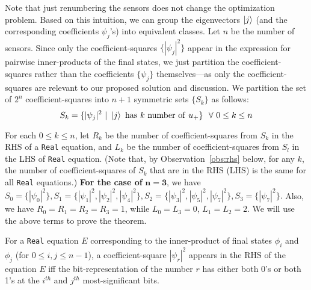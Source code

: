 Note that just renumbering the sensors does not change the optimization problem. 
Based on this intuition, we can group the eigenvectors $\ket{j}$
(and the corresponding coefficients $\psi_j$'s) into equivalent classes. 
Let $n$ be the number of sensors.  
Since only the coefficient-squares $\{|\psi_j|^2\}$ appear in the expression for pairwise inner-products of the final states, 
we just partition the coefficient-squares rather than the coefficients $\{\psi_j\}$ themselves---as only the coefficient-squares are relevant to our proposed solution and discussion. 
We partition the set of $2^n$ coefficient-squares into $n+1$ symmetric sets $\{S_k\}$ as follows: 
$$S_k =   \{|\psi_j|^{2}\ |\ \ket{j}\ {\rm has}\ k\  {\rm number\ of}\ u_{+}\}\ \ \forall \ 0 \leq k \leq n$$

\noindent
For each $0 \leq k \leq n$, let $R_k$ be the number of coefficient-squares from $S_k$ in the RHS of a {\tt Real} equation, and $L_k$ be the number of coefficient-squares from $S_l$ in the LHS of  {\tt Real} equation. (Note that, by Observation~\ref{obs:rhs} below, for any $k$, the number of coefficient-squares of $S_k$ that are in the RHS (LHS) is the same for all {\tt Real} equations.)
{\bf For the case of} $\mathbf{n=3}$, we have
$S_0 = \{|\psi_0|^{2}\}, 
S_1 = \{|\psi_1|^{2},  |\psi_2|^{2},  |\psi_4|^{2} \}, 
S_2 = \{|\psi_3|^{2},  |\psi_5|^{2},  |\psi_7|^{2} \}, 
S_3 = \{|\psi_7|^{2} \}.$ Also, we have $R_0 = R_1 = R_2 = R_3 = 1$, while $L_0 = L_3 = 0$, $L_1 = L_2 = 2$. 
We will use the above terms to prove the theorem. 
\medskip
\medskip

\begin{observation}
For a {\tt Real} equation $E$ corresponding to the inner-product of final states $\phi_i$ and $\phi_j$ (for $0 \leq i, j \leq n-1$), a coefficient-square $|\psi_r|^2$ appears in the RHS of the equation $E$ iff the bit-representation of the number $r$ has either both 0's or both 1's at the $i^{th}$ and $j^{th}$ most-significant bits.
\label{obs:rhs}
\end{observation}

